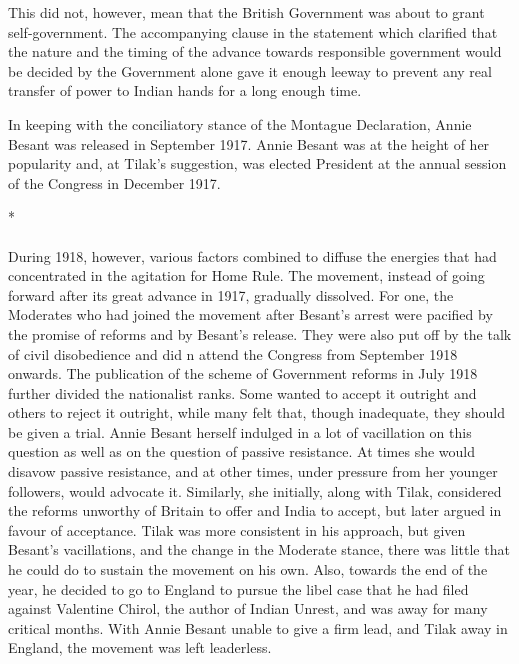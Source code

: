 This did not, however, mean that the British Government was about to grant self-government. The accompanying clause in the statement which clarified that the nature and the timing of the advance towards responsible government would be decided by the Government alone gave it enough leeway to prevent any real transfer of power to Indian hands for a long enough time.

In keeping with the conciliatory stance of the Montague Declaration, Annie Besant was released in September 1917. Annie Besant was at the height of her popularity and, at Tilak's suggestion, was elected President at the annual session of the Congress in December 1917.

\begin{center}*\end{center}

\paragraph*{}

During 1918, however, various factors combined to diffuse the energies that had concentrated in the agitation for Home Rule. The movement, instead of going forward after its great advance in 1917, gradually dissolved. For one, the Moderates who had joined the movement after Besant's arrest were pacified by the promise of reforms and by Besant's release. They were also put off by the talk of civil disobedience and did n attend the Congress from September 1918 onwards. The publication of the scheme of Government reforms in July 1918 further divided the nationalist ranks. Some wanted to accept it outright and others to reject it outright, while many felt that, though inadequate, they should be given a trial. Annie Besant herself indulged in a lot of vacillation on this question as well as on the question of passive resistance. At times she would disavow passive resistance, and at other times, under pressure from her younger followers, would advocate it. Similarly, she initially, along with Tilak, considered the reforms unworthy of Britain to offer and India to accept, but later argued in favour of acceptance. Tilak was more consistent in his approach, but given Besant's vacillations, and the change in the Moderate stance, there was little that he could do to sustain the movement on his own. Also, towards the end of the year, he decided to go to England to pursue the libel case that he had filed against Valentine Chirol, the author of Indian Unrest, and was away for many critical months. With Annie Besant unable to give a firm lead, and Tilak away in England, the movement was left leaderless.

